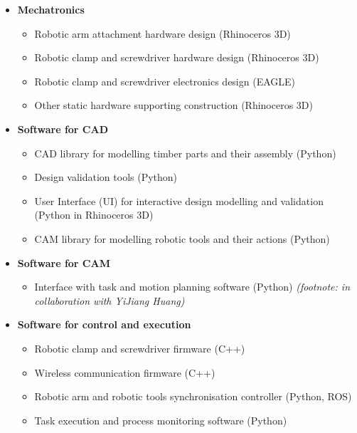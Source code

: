 \begin{itemize}
	\item \textbf{Mechatronics}

    \begin{itemize}
    	\item Robotic arm attachment hardware design (Rhinoceros 3D) 
    
    	\item Robotic clamp and screwdriver hardware design (Rhinoceros 3D) 
    
    	\item Robotic clamp and screwdriver electronics design (EAGLE)
    
    	\item Other static hardware supporting construction (Rhinoceros 3D) 
    
    \end{itemize}
    
	\item \textbf{Software for CAD}

    \begin{itemize}
    	\item CAD library for modelling timber parts and their assembly (Python)
    
    	\item Design validation tools (Python)
    
    	\item User Interface (UI) for interactive design modelling and validation (Python in Rhinoceros 3D) 
    
    	\item CAM library for modelling robotic tools and their actions (Python)
    
    \end{itemize}
    
    \item \textbf{Software for CAM}

    \begin{itemize}
    	\item Interface with task and motion planning software (Python) \textit{(footnote: in collaboration with YiJiang Huang)}
    
    \end{itemize}
    
     \item \textbf{Software for control and execution}

    \begin{itemize}
    	\item Robotic clamp and screwdriver firmware (C++)
    
    	\item Wireless communication firmware (C++)
    
    	\item Robotic arm and robotic tools synchronisation controller (Python, ROS)
    
    	\item Task execution and process monitoring software (Python)
    
    \end{itemize}
\end{itemize}

